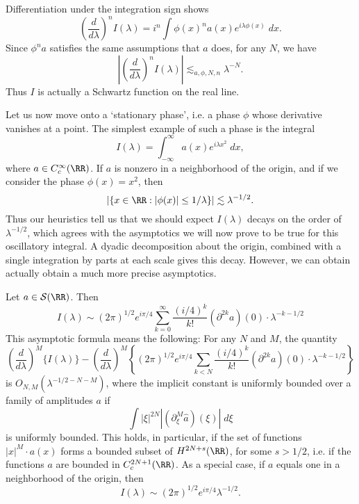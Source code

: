 \begin{remark}
    Differentiation under the integration sign shows
    \[ \left( \frac{d}{d\lambda} \right)^n I (\lambda) = i^n \int \phi(x)^n a(x) e^{i \lambda \phi(x)}\; dx. \]
    Since $\phi^n a$ satisfies the same assumptions that $a$ does, for any $N$, we have
    \[ \left| \left( \frac{d}{d\lambda} \right)^n I (\lambda) \right| \lesssim_{a,\phi,N,n} \lambda^{-N}. \]
    Thus $I$ is actually a Schwartz function on the real line. %
\end{remark}

Let us now move onto a `stationary phase', i.e. a phase $\phi$ whose derivative vanishes at a point. The simplest example of such a phase is the integral
%
\[ I(\lambda) = \int_{-\infty}^\infty a(x) e^{i \lambda x^2}\; dx, \]
%
where $a \in C_c^\infty(\RR)$. If $a$ is nonzero in a neighborhood of the origin, and if we consider the phase $\phi(x) = x^2$, then
%
\[ |\{ x \in \RR : |\phi(x)| \leq 1/\lambda \}| \lesssim \lambda^{-1/2}. \]
%
Thus our heuristics tell us that we should expect $I(\lambda)$ decays on the order of $\lambda^{-1/2}$, which agrees with the asymptotics we will now prove to be true for this oscillatory integral. A dyadic decomposition about the origin, combined with a single integration by parts at each scale gives this decay. However, we can obtain actually obtain a much more precise asymptotics.

\begin{theorem}
  Let $a \in \mathcal{S}(\RR)$. Then
  \[ I(\lambda) \sim (2 \pi)^{1/2} e^{i \pi / 4} \sum_{k = 0}^\infty \frac{(i/4)^k}{k!} (\partial^{2k} a)(0) \cdot \lambda^{-k-1/2} \]
  This asymptotic formula means the following: For any $N$ and $M$, the quantity
  \[ \left( \frac{d}{d\lambda} \right)^M \{ I(\lambda) \} - \left( \frac{d}{d\lambda} \right)^M \left\{ (2 \pi)^{1/2} e^{i \pi / 4} \sum_{k < N} \frac{(i/4)^k}{k!} (\partial^{2k} a)(0) \cdot \lambda^{-k-1/2} \right\} \]
  is $O_{N,M}(\lambda^{-1/2-N-M})$, where the implicit constant is uniformly bounded over a family of amplitudes $a$ if
  \[ \int |\xi|^{2N} |(\partial_\xi^M \widehat{a})(\xi)|\; d\xi \]
  is uniformly bounded. This holds, in particular, if the set of functions $|x|^M \cdot a(x)$ forms a bounded subset of $H^{2N+s}(\RR)$, for some $s > 1/2$, i.e. if the functions $a$ are bounded in $C_c^{2N+1}(\RR)$. As a special case, if $a$ equals one in a neighborhood of the origin, then
  \[ I(\lambda) \sim (2 \pi)^{1/2} e^{i \pi / 4} \lambda^{-1/2}. \]
\end{theorem}

